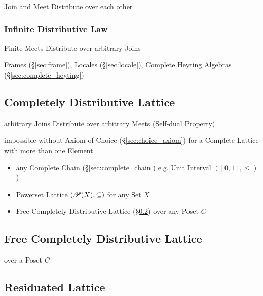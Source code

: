 Join and Meet Distribute over each other



\subsubsection{Infinite Distributive Law}
\label{sec:infinite_distributive}

Finite Meets Distribute over arbitrary Joins

Frames (\S\ref{sec:frame}), Locales (\S\ref{sec:locale}), Complete
Heyting Algebras (\S\ref{sec:complete_heyting})



\subsection{Completely Distributive Lattice}
\label{sec:completely_distributive}

arbitrary Joins Distribute over arbitrary Meets (Self-dual Property)

impossible without Axiom of Choice (\S\ref{sec:choice_axiom}) for a
Complete Lattice with more than one Element

\begin{itemize}
  \item any Complete Chain (\S\ref{sec:complete_chain}) e.g. Unit
    Interval $([0,1], \leq)$)
  \item Powerset Lattice $(\mathscr{P}(X), \subseteq)$ for any Set
    $X$
  \item Free Completely Distributive Lattice
    (\S\ref{sec:free_completely_distributive_lattice}) over any Poset
    $C$
\end{itemize}



\subsection{Free Completely Distributive Lattice}
\label{sec:free_completely_distributive_lattice}

over a Poset $C$



\subsection{Residuated Lattice}\label{sec:residuated_lattice}

